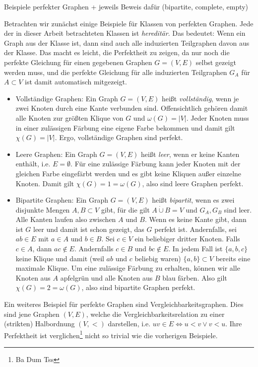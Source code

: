 \documentclass[../main.tex]{subfiles}
\begin{document}
Beispiele perfekter Graphen + jeweils Beweis dafür
    (bipartite, complete, empty)

Betrachten wir zunächst einige Beispiele für Klassen von perfekten Graphen. Jede der in dieser Arbeit betrachteten Klassen ist \emph{hereditär}. Das bedeutet: Wenn ein Graph aus der Klasse ist, dann sind auch alle induzierten Teilgraphen davon aus der Klasse. Das macht es leicht, die Perfektheit zu zeigen, da nur noch die perfekte Gleichung für einen gegebenen Graphen $G = (V, E)$ selbst gezeigt werden muss, und die perfekte Gleichung für alle induzierten Teilgraphen $G_A$ für $A \subset V$ ist damit automatisch mitgezeigt.

\begin{itemize}
    \item Vollständige Graphen: Ein Graph $G = (V, E)$ heißt \emph{vollständig}, wenn je zwei Knoten durch eine Kante verbunden sind. Offensichtlich gehören damit alle Knoten zur größten Klique von $G$ und $\omega(G) = |V|$. Jeder Knoten muss in einer zulässigen Färbung eine eigene Farbe bekommen und damit gilt $\chi(G) = |V|$. Ergo, vollständige Graphen sind perfekt.
    \item Leere Graphen: Ein Graph $G = (V, E)$ heißt \emph{leer}, wenn er keine Kanten enthält, i.e. $E = \emptyset$. Für eine zulässige Färbung kann jeder Knoten mit der gleichen Farbe eingefärbt werden und es gibt keine Kliquen außer einzelne Knoten. Damit gilt $\chi(G) = 1 = \omega(G)$, also sind leere Graphen perfekt.
    \item Bipartite Graphen: Ein Graph $G = (V, E)$ heißt \emph{bipartit}, wenn es zwei disjunkte Mengen $A, B \subset V$ gibt, für die gilt $A \dot\cup B = V$ und $G_A, G_B$ sind leer. Alle Kanten laufen also zwischen $A$ und $B$. Wenn es keine Kante gibt, dann ist $G$ leer und damit ist schon gezeigt, das $G$ perfekt ist. Andernfalls, sei $ab \in E$ mit $a \in A$ und $b \in B$. Sei $c \in V$ ein beliebiger dritter Knoten. Falls $c \in A$, dann $ac \notin E$. Andernfalls $c \in B$ und $bc \notin E$. In jedem Fall ist $\{a, b, c\}$ keine Klique und damit (weil $ab$ und $c$ beliebig waren) $\{a, b\} \subset V$ bereits eine maximale Klique. Um eine zulässige Färbung zu erhalten, können wir alle Knoten aus $A$ apfelgrün und alle Knoten aus $B$ blau färben. Also gilt $\chi(G) = 2 = \omega(G)$, also sind bipartite Graphen perfekt.
\end{itemize}

Ein weiteres Beispiel für perfekte Graphen sind Vergleichbarkeitsgraphen. Dies sind jene Graphen $(V, E)$, welche die Vergleichbarkeitsrelation zu einer (strikten) Halbordnung $(V, <)$ darstellen, i.e. $uv \in E \Leftrightarrow u < v \vee v < u$. Ihre Perfektheit ist verglichen\footnote{Ba Dum Tss} nicht so trivial wie die vorherigen Beispiele.
\end{document}
